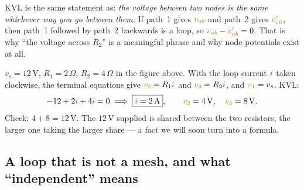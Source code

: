 \documentclass[11pt,a4paper]{article}
\newcommand{\Icol}[1]{\textcolor{ccur}{#1}}
\newcommand{\Vcol}[1]{\textcolor{cvolt}{#1}}
\newcommand{\uni}[1]{\,\mathrm{#1}}
\newcommand{\A}{\uni{A}}   \newcommand{\V}{\uni{V}}
\newcommand{\ohm}{\,\Omega}
\begin{document}
\begin{ideabox}
KVL is the same statement as: \emph{the voltage between two nodes is the same whichever
way you go between them.} If path~1 gives $\Vcol{v_{ab}}$ and path~2 gives
$\Vcol{v'_{ab}}$, then path~1 followed by path~2 backwards is a loop, so
$\Vcol{v_{ab}} - \Vcol{v'_{ab}} = 0$. That is why ``the voltage across $R_2$'' is a
meaningful phrase and why node potentials exist at all.
\end{ideabox}

\begin{examplebox}
$v_s = 12\V$, $R_1 = 2\ohm$, $R_2 = 4\ohm$ in the figure above. With the loop current
$\Icol{i}$ taken clockwise, the terminal equations give
$\Vcol{v_2} = R_1 \Icol{i}$ and $\Vcol{v_3} = R_2 \Icol{i}$, and $\Vcol{v_1} = v_s$. KVL:
\[
  -12 + 2\Icol{i} + 4\Icol{i} = 0
  \;\Longrightarrow\;
  \boxed{\Icol{i} = 2\A}, \qquad \Vcol{v_2} = 4\V, \quad \Vcol{v_3} = 8\V .
\]
Check: $4 + 8 = 12\V$. The $12\V$ supplied is shared between the two resistors, the larger
one taking the larger share --- a fact we will soon turn into a formula.
\end{examplebox}

\subsection{A loop that is not a mesh, and what ``independent'' means}
\end{document}
